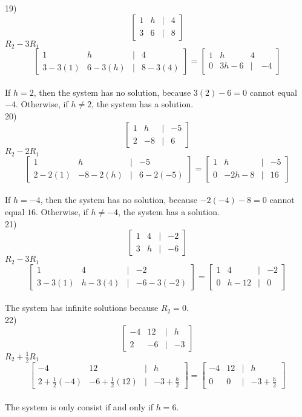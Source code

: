 \documentclass[]{article}
\begin{document}
19) \[
\begin{bmatrix}
	1 & h &|& 4\\
	3 & 6 &|& 8
\end{bmatrix}
\]
$R_2-3R_1$
\[
\begin{bmatrix}
	1&h&|&4\\
	3-3(1)&6-3(h)&|&8-3(4)
\end{bmatrix}=
\begin{bmatrix}
	1&h&4\\
	0&3h-6&|&-4
\end{bmatrix}
\]\\
If $h=2$, then the system has no solution, because $3(2)-6=0$ cannot equal $-4$. Otherwise, if $h\neq2$, the system has a solution.\\

20) \[
\begin{bmatrix}
	1&h&|&-5\\
	2&-8&|&6
\end{bmatrix}
\]
$R_2-2R_1$
\[
\begin{bmatrix}
	1&h&|&-5\\
	2-2(1)&-8-2(h)&|&6-2(-5)
\end{bmatrix}=
\begin{bmatrix}
	1&h&|&-5\\
	0&-2h-8&|&16
\end{bmatrix}
\]\\
If $h=-4$, then the system has no solution, because $-2(-4)-8=0$ cannot equal $16$. Otherwise, if $h\neq-4$, the system has a solution.\\

21) \[
\begin{bmatrix}
	1&4&|&-2\\
	3&h&|&-6
\end{bmatrix}
\]
$R_2-3R_1$
\[
\begin{bmatrix}
	1&4&|&-2\\
	3-3(1)&h-3(4)&|&-6-3(-2)
\end{bmatrix}=
\begin{bmatrix}
	1&4&|&-2\\
	0&h-12&|&0
\end{bmatrix}
\]\\
The system has infinite solutions because $R_2 = 0$.\\

22) \[
\begin{bmatrix}
	-4&12&|&h\\
	2&-6&|&-3
\end{bmatrix}
\]
$R_2+\frac{1}{2}R_1$
\[
\begin{bmatrix}
	-4&12&|&h\\
	2+\frac{1}{2}(-4)&-6+\frac{1}{2}(12)&|&-3+\frac{h}{2}
\end{bmatrix}=
\begin{bmatrix}
	-4&12&|&h\\
	0&0&|&-3+\frac{h}{2}
\end{bmatrix}
\]\\
The system is only consist if and only if $h=6$.\\
\end{document}
